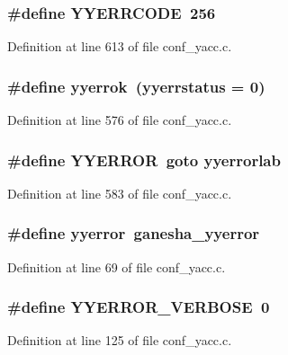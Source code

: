 \subsubsection[{YYERRCODE}]{\setlength{\rightskip}{0pt plus 5cm}\#define YYERRCODE~256}\label{conf__yacc_8c_a552f295255821fa7dea11b0237e1d61a}


Definition at line 613 of file conf\_\-yacc.c.
\subsubsection[{yyerrok}]{\setlength{\rightskip}{0pt plus 5cm}\#define yyerrok~(yyerrstatus = 0)}\label{conf__yacc_8c_a20bf055e53dc4fd5afddfd752a4d1adb}


Definition at line 576 of file conf\_\-yacc.c.
\subsubsection[{YYERROR}]{\setlength{\rightskip}{0pt plus 5cm}\#define YYERROR~goto yyerrorlab}\label{conf__yacc_8c_af1eef6197be78122699013d0784acc80}


Definition at line 583 of file conf\_\-yacc.c.
\subsubsection[{yyerror}]{\setlength{\rightskip}{0pt plus 5cm}\#define yyerror~ganesha\_\-yyerror}\label{conf__yacc_8c_afd2adb2274e61b81cf475d1ebea69d50}


Definition at line 69 of file conf\_\-yacc.c.
\subsubsection[{YYERROR\_\-VERBOSE}]{\setlength{\rightskip}{0pt plus 5cm}\#define YYERROR\_\-VERBOSE~0}\label{conf__yacc_8c_a0943f558a560b9b5fa0593d7e36496c1}


Definition at line 125 of file conf\_\-yacc.c.
